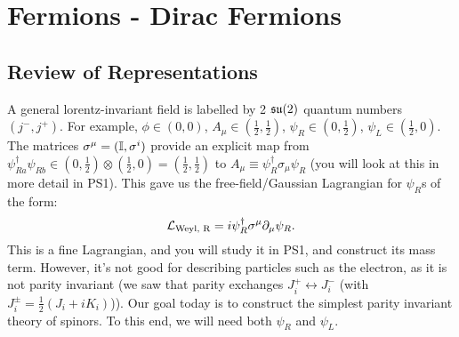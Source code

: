 \section{Fermions - Dirac Fermions}
\subsection{Review of Representations}
A general lorentz-invariant field is labelled by 2 $\mathfrak{su}(2)$ quantum numbers $(j^-, j^+)$. For example, $\phi \in (0, 0)$, $A_\mu \in (\frac{1}{2}, \frac{1}{2})$, $\psi_R \in (0, \frac{1}{2})$, $\psi_L \in (\frac{1}{2}, 0)$. The matrices $\sigma^\mu = (\mathbb{I}, \sigma^i)$ provide an explicit map from $\psi_{Ra}^\dag\psi_{Rb} \in (0, \frac{1}{2}) \otimes (\frac{1}{2}, 0) = (\frac{1}{2}, \frac{1}{2})$ to $A_\mu \equiv \psi_R^\dag \sigma_\mu \psi_R$ (you will look at this in more detail in PS1). This gave us the free-field/Gaussian Lagrangian for $\psi_R$s of the form:
\begin{equation}
    \mathcal{L}_{\text{Weyl, R}} = i\psi_R^\dagger \sigma^\mu \partial_\mu \psi_R.
\end{equation}
This is a fine Lagrangian, and you will study it in PS1, and construct its mass term. However, it's not good for describing particles such as the electron, as it is not parity invariant (we saw that parity exchanges $J^+_i \leftrightarrow J^-_i$ (with $J^\pm_i = \frac{1}{2}(J_i + iK_i)$)). Our goal today is to construct the simplest parity invariant theory of spinors. To this end, we will need both $\psi_R$ and $\psi_L$.

